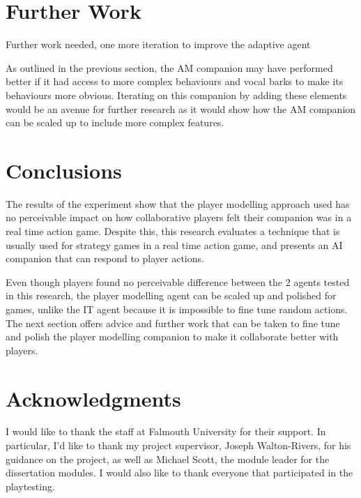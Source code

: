 \documentclass{IEEEtran}
\begin{document}
\section{Further Work}
\label{Further Work}

Further work needed, one more iteration to improve the adaptive agent

As outlined in the previous section, the AM companion may have performed better if it had access to more complex behaviours and vocal barks to make its behaviours more obvious. Iterating on this companion by adding these elements would be an avenue for further research as it would show how the AM companion can be scaled up to include more complex features.

\section{Conclusions}
\label{Conclusions}

The results of the experiment show that the player modelling approach used has no perceivable impact on how collaborative players felt their companion was in a real time action game. Despite this, this research evaluates a technique that is usually used for strategy games in a real time action game, and presents an AI companion that can respond to player actions.

Even though players found no perceivable difference between the 2 agents tested in this research, the player modelling agent can be scaled up and polished for games, unlike the IT agent because it is impossible to fine tune random actions. The next section offers advice and further work that can be taken to fine tune and polish the player modelling companion to make it collaborate better with players.

\section*{Acknowledgments}

I would like to thank the staff at Falmouth University for their support. In particular, I'd like to thank my project supervisor, Joseph Walton-Rivers, for his guidance on the project, as well as Michael Scott, the module leader for the dissertation modules. I would also like to thank everyone that participated in the playtesting.



 
\end{document}
